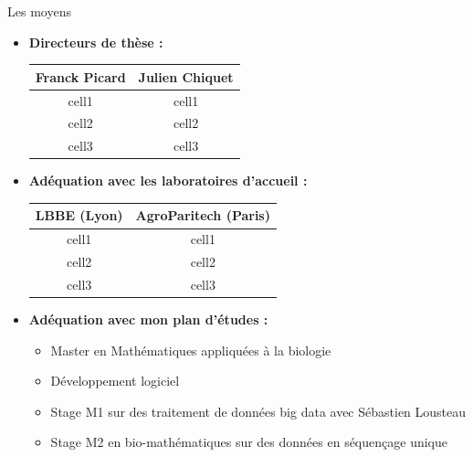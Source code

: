 \documentclass[10pt]{beamer}
\begin{document}
\begin{frame}{Les moyens}
\begin{itemize}
    \item \textbf{Directeurs de thèse :} \\
        \begin{center}
        \begin{tabular}{ |c|c| } 
            \hline
            Franck Picard & Julien Chiquet \\
             \hline
             cell1 & cell1 \\ 
             cell2 & cell2 \\ 
             cell3 & cell3 \\ 
             \hline
        \end{tabular}
        \end{center}

    \item \textbf{Adéquation avec les laboratoires d'accueil : }\\
    \begin{center}
        \begin{tabular}{ |c|c| } 
            \hline
            LBBE (Lyon) & AgroParitech (Paris) \\
             \hline
             cell1 & cell1 \\ 
             cell2 & cell2 \\ 
             cell3 & cell3 \\ 
             \hline
        \end{tabular}
        \end{center}
    \item \textbf{Adéquation avec mon plan d'études :} \\
        \begin{itemize}
            \item Master en Mathématiques appliquées à la biologie
            \item Développement logiciel
            \item Stage M1 sur des traitement de données big data avec Sébastien Lousteau
            \item Stage M2 en bio-mathématiques sur des données en séquençage unique
        \end{itemize}
\end{itemize}
    
\end{frame}
\end{document}
